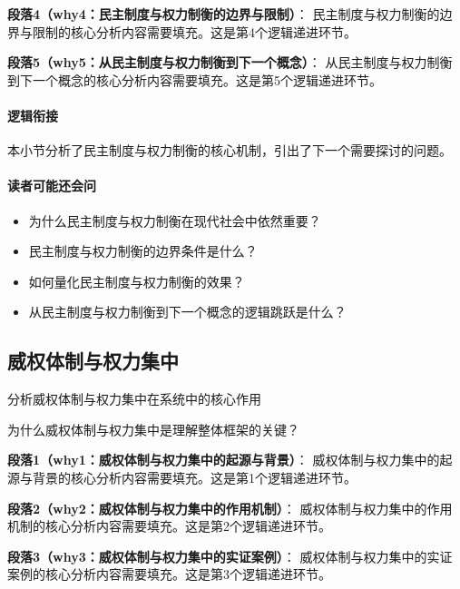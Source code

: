 \documentclass[../main.tex]{subfiles}
\begin{document}
\textbf{段落4（why4：民主制度与权力制衡的边界与限制）}：
民主制度与权力制衡的边界与限制的核心分析内容需要填充。这是第4个逻辑递进环节。


\textbf{段落5（why5：从民主制度与权力制衡到下一个概念）}：
从民主制度与权力制衡到下一个概念的核心分析内容需要填充。这是第5个逻辑递进环节。


\paragraph*{逻辑衔接}
本小节分析了民主制度与权力制衡的核心机制，引出了下一个需要探讨的问题。

\paragraph*{读者可能还会问}
\begin{itemize}
\item 为什么民主制度与权力制衡在现代社会中依然重要？
\item 民主制度与权力制衡的边界条件是什么？
\item 如何量化民主制度与权力制衡的效果？
\item 从民主制度与权力制衡到下一个概念的逻辑跳跃是什么？
\end{itemize}


\subsection{威权体制与权力集中}

\begin{motivation}
分析威权体制与权力集中在系统中的核心作用
\end{motivation}

\begin{logicmap}
[逻辑链占位]
\end{logicmap}

\begin{questionbox}
为什么威权体制与权力集中是理解整体框架的关键？
\end{questionbox}

\textbf{段落1（why1：威权体制与权力集中的起源与背景）}：
威权体制与权力集中的起源与背景的核心分析内容需要填充。这是第1个逻辑递进环节。


\textbf{段落2（why2：威权体制与权力集中的作用机制）}：
威权体制与权力集中的作用机制的核心分析内容需要填充。这是第2个逻辑递进环节。


\textbf{段落3（why3：威权体制与权力集中的实证案例）}：
威权体制与权力集中的实证案例的核心分析内容需要填充。这是第3个逻辑递进环节。
\end{document}
